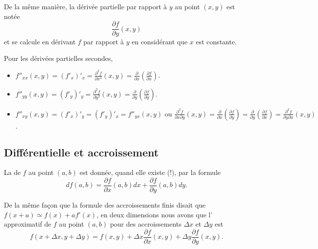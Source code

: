 De la même manière, la dérivée partielle par rapport à $y$ au point $(x,y)$ est notée
\begin{equation}
	\frac{\partial f}{\partial y}(x,y) 
\end{equation}
et se calcule en dérivant $f$ par rapport  à $y$ en considérant que $x$ est constante.

Pour les dérivées partielles secondes,
\begin{itemize}
\item $f''_{xx} (x,y) = (f'_x)'_x = \frac{\partial^2 f}{\partial x^2}(x,y) = \frac{\partial}{\partial x}(\frac{\partial f}{\partial x})$.
\item $f''_{yy} (x,y) = (f'_y)'_y = \frac{\partial^2 f}{\partial y^2}(x,y) = \frac{\partial}{\partial y}(\frac{\partial f}{\partial y})$.
\item $f''_{xy} (x,y) = (f'_x)'_y  = (f'_y)'_x = f''_{yx} (x,y) \text{ ou } \frac{\partial^2 f}{\partial x \partial y}(x,y) = \frac{\partial}{\partial x}(\frac{\partial f}{\partial y})  = \frac{\partial}{\partial y}(\frac{\partial f}{\partial x}) =\frac{\partial^2 f}{\partial y \partial x}(x,y)$.
\end{itemize}

\subsection{Différentielle et accroissement}

La  de $f$ au point $(a,b)$ est donnée, quand elle existe (!), par la formule
\begin{equation}
	df(a,b) = \frac{\partial f}{\partial x}(a,b)dx + \frac{\partial f}{\partial y}(a,b) dy.
\end{equation}

De la même façon que la formule des accroissements finis disait que $f(x+a)\simeq f(x)+af'(x)$, en deux dimensions nous avons que l' approximatif de $f$ au point $(a,b)$ pour des accroissements $\Delta x$ et $\Delta y$ est 
\begin{equation}
	f(x+\Delta x,y+\Delta y)=f(x,y)+\Delta x\frac{ \partial f }{ \partial x }(x,y)+\Delta y\frac{ \partial f }{ \partial y }(x,y).
\end{equation}

